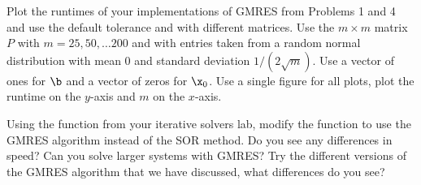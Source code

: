 Plot the runtimes of your implementations of GMRES from Problems 1 and 4 and  use the default tolerance and  with different matrices.
Use the $m \times m$ matrix $P$ with $m=25,50,\dots 200$ and with entries taken from a random normal distribution with mean 0 and standard deviation $1/(2\sqrt{m})$.
Use a vector of ones for $\b$ and a vector of zeros for $\x_0$.
Use a single figure for all plots, plot the runtime on the $y$-axis and $m$ on the $x$-axis.

Using the function  from your iterative solvers lab, modify the  function to use the GMRES algorithm instead of the SOR method.
Do you see any differences in speed?
Can you solve larger systems with GMRES?
Try the different versions of the GMRES algorithm that we have discussed, what differences do you see?
